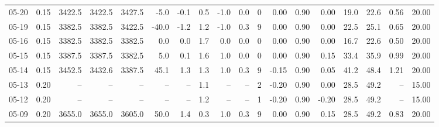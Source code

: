 \begin{threeparttable}
{\begin{tabular}{lrrrrrrrrrrrrrrrrr}
  05-20 &     0.15 & 3422.5 & 3422.5 & 3427.5 &       -5.0 &           -0.1 &                       0.5 &                     -1.0 &                 0.0 &              0 &       0.00 &      0.90 &           0.00 &             19.0 &                22.6 &            0.56 &                  20.00 \\
  05-19 &     0.15 & 3382.5 & 3382.5 & 3422.5 &      -40.0 &           -1.2 &                       1.2 &                     -1.0 &                 0.3 &              9 &       0.00 &      0.90 &           0.00 &             22.5 &                25.1 &            0.65 &                  20.00 \\
  05-16 &     0.15 & 3382.5 & 3382.5 & 3382.5 &        0.0 &            0.0 &                       1.7 &                      0.0 &                 0.0 &              0 &       0.00 &      0.90 &           0.00 &             16.7 &                22.6 &            0.50 &                  20.00 \\
  05-15 &     0.15 & 3387.5 & 3387.5 & 3382.5 &        5.0 &            0.1 &                       1.6 &                      1.0 &                 0.0 &              0 &       0.00 &      0.90 &           0.15 &             33.4 &                35.9 &            0.99 &                  20.00 \\
  05-14 &     0.15 & 3452.5 & 3432.6 & 3387.5 &       45.1 &            1.3 &                       1.3 &                      1.0 &                 0.3 &              9 &      -0.15 &      0.90 &           0.05 &             41.2 &                48.4 &            1.21 &                  20.00 \\
  05-13 &     0.20 &     -- &     -- &     -- &         -- &             -- &                       1.1 &                       -- &                  -- &              2 &      -0.20 &      0.90 &           0.00 &             28.5 &                49.2 &              -- &                  15.00 \\
  05-12 &     0.20 &     -- &     -- &     -- &         -- &             -- &                       1.2 &                       -- &                  -- &              1 &      -0.20 &      0.90 &          -0.20 &             28.5 &                49.2 &              -- &                  15.00 \\
  05-09 &     0.20 & 3655.0 & 3655.0 & 3605.0 &       50.0 &            1.4 &                       0.3 &                      1.0 &                 0.3 &              9 &       0.00 &      0.90 &           0.15 &             28.5 &                49.2 &            0.83 &                  20.00 \\

\end{tabular}}
\end{threeparttable}
